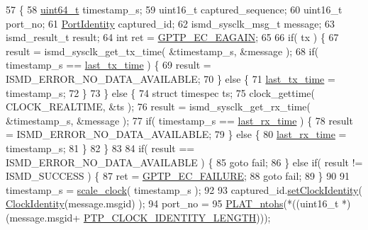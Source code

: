 \begin{DoxyCode}
57                                    \{
58     \hyperlink{parse_8c_aec6fcb673ff035718c238c8c9d544c47}{uint64\_t} timestamp\_s;
59     uint16\_t captured\_sequence;
60     uint16\_t port\_no;
61     \hyperlink{class_port_identity}{PortIdentity} captured\_id;
62     ismd\_sysclk\_msg\_t message;
63     ismd\_result\_t result;
64     \textcolor{keywordtype}{int} ret = \hyperlink{ieee1588_8hpp_aee74e806e4f7deb78c6adee61f5dac87}{GPTP\_EC\_EAGAIN};
65 
66     \textcolor{keywordflow}{if}( tx ) \{
67         result = ismd\_sysclk\_get\_tx\_time( &timestamp\_s, &message );
68         \textcolor{keywordflow}{if}( timestamp\_s == \hyperlink{class_linux_timestamper_intel_c_e_ad099415a2577527cc1f7a0258f050d57}{last\_tx\_time} ) \{
69             result = ISMD\_ERROR\_NO\_DATA\_AVAILABLE;
70         \} \textcolor{keywordflow}{else} \{
71             \hyperlink{class_linux_timestamper_intel_c_e_ad099415a2577527cc1f7a0258f050d57}{last\_tx\_time} = timestamp\_s;
72         \}
73     \} \textcolor{keywordflow}{else} \{
74         \textcolor{keyword}{struct }timespec ts;
75         clock\_gettime( CLOCK\_REALTIME, &ts );
76         result = ismd\_sysclk\_get\_rx\_time( &timestamp\_s, &message );
77         \textcolor{keywordflow}{if}( timestamp\_s == \hyperlink{class_linux_timestamper_intel_c_e_af1dded3f45070e35eba64d2474864dfb}{last\_rx\_time} ) \{
78             result = ISMD\_ERROR\_NO\_DATA\_AVAILABLE;
79         \} \textcolor{keywordflow}{else} \{
80             \hyperlink{class_linux_timestamper_intel_c_e_af1dded3f45070e35eba64d2474864dfb}{last\_rx\_time} = timestamp\_s;
81         \}
82     \}
83 
84     \textcolor{keywordflow}{if}( result == ISMD\_ERROR\_NO\_DATA\_AVAILABLE ) \{
85         \textcolor{keywordflow}{goto} fail;
86     \} \textcolor{keywordflow}{else} \textcolor{keywordflow}{if}( result != ISMD\_SUCCESS ) \{
87         ret = \hyperlink{ieee1588_8hpp_ab75a746f471bd4537a099d86b38d78c1}{GPTP\_EC\_FAILURE};
88         \textcolor{keywordflow}{goto} fail;
89     \}
90 
91     timestamp\_s = \hyperlink{linux__hal__intelce_8cpp_aedd001ba04a531b4f23af1c9bd845382}{scale\_clock}( timestamp\_s );
92 
93     captured\_id.\hyperlink{class_port_identity_abb9510d7ee3a171a6d55ab2cec30d3a6}{setClockIdentity}( \hyperlink{class_clock_identity}{ClockIdentity}(message.msgid) );
94     port\_no =
95         \hyperlink{linux_2src_2platform_8cpp_a6b8f3e7b87b66fa774a07ddc67f883a7}{PLAT\_ntohs}(*((uint16\_t *)(message.msgid+
      \hyperlink{ptptypes_8hpp_afd1566058ed7927c2b790c9d4a0051ec}{PTP\_CLOCK\_IDENTITY\_LENGTH})));

\end{DoxyCode}
